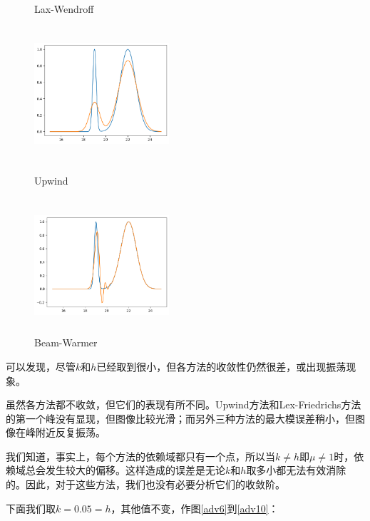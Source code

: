 \documentclass{ctexart}
\begin{document}
\begin{figure}[htbp]
\begin{minipage}{5cm}
		\caption{Lax-Wendroff}
		\label{adv3}
	\end{minipage}
	\begin{minipage}{5cm}
		\centering
		\includegraphics[width = 5cm, height = 5cm]{3-4.png}
		\caption{Upwind}
		\label{adv4}
	\end{minipage}
	\begin{minipage}{5cm}
		\centering
		\includegraphics[width = 5cm, height = 5cm]{3-5.png}
		\caption{Beam-Warmer}
		\label{adv5}
	\end{minipage}
\end{figure}

可以发现，尽管$k$和$h$已经取到很小，但各方法的收敛性仍然很差，或出现振荡现象。

虽然各方法都不收敛，但它们的表现有所不同。Upwind方法和Lex-Friedrichs方法的第一个峰没有显现，但图像比较光滑；而另外三种方法的最大模误差稍小，但图像在峰附近反复振荡。

我们知道，事实上，每个方法的依赖域都只有一个点，所以当$k\neq h$即$\mu\neq 1$时，依赖域总会发生较大的偏移。这样造成的误差是无论$k$和$h$取多小都无法有效消除的。因此，对于这些方法，我们也没有必要分析它们的收敛阶。

下面我们取$k=0.05=h$，其他值不变，作图\ref{adv6}到\ref{adv10}：
\end{document}
